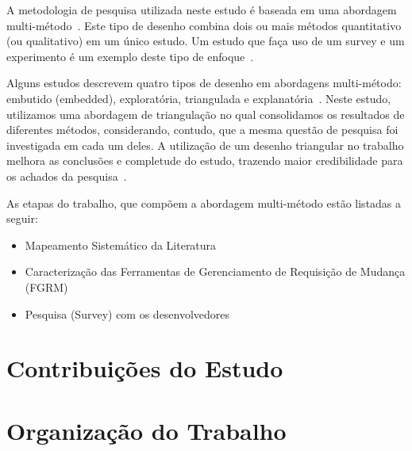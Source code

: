 A metodologia de pesquisa utilizada neste estudo é baseada em uma abordagem
multi-método~\cite{hesse2010mixed}. Este tipo de desenho  combina dois ou mais
métodos quantitativo (ou qualitativo) em um único estudo. Um estudo que faça uso
de um survey e um experimento é um exemplo deste tipo de
enfoque~\cite{hesse2010mixed}.

Alguns estudos descrevem quatro tipos de desenho em abordagens multi-método:
embutido (embedded), exploratória, triangulada e
explanatória~\cite{creswell2007designing}. Neste estudo, utilizamos uma
abordagem de triangulação no qual consolidamos os resultados de diferentes
métodos, considerando, contudo, que a mesma questão de pesquisa foi investigada
em cada um deles. A utilização de um desenho triangular no trabalho melhora as
conclusões e completude do estudo, trazendo maior credibilidade para os achados
da pesquisa~\cite{hesse2010mixed}.

As etapas do trabalho, que compõem a abordagem multi-método estão listadas a
seguir:

\begin{itemize}[(i)]
	\item Mapeamento Sistemático da Literatura~\cite{Petersen2008}
	\item Caracterização das Ferramentas de Gerenciamento de Requisição de
		Mudança (FGRM)
	\item Pesquisa (Survey) com os
		desenvolvedores~\cite{wohlin2012experimentation}
\end{itemize}

\section{Contribuições do Estudo}
\label{sec:intro-contribuicao}
\section{Organização do Trabalho}
\label{sec:intro-organizacao-dissertacao}

